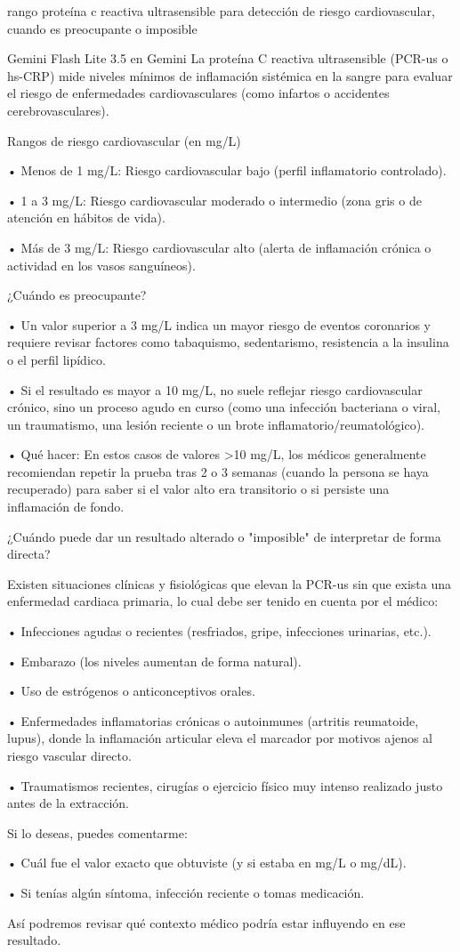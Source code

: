 \documentclass[12pt,a4paper,oneside]{book}
\begin{document}
\begin{iaprompt}
rango proteína c reactiva ultrasensible para detección de riesgo cardiovascular, cuando es preocupante o imposible
\end{iaprompt}
\begin{iaresp}{Gemini Flash Lite 3.5 en Gemini}
La proteína C reactiva ultrasensible (PCR-us o hs-CRP) mide niveles mínimos de inflamación sistémica en la sangre para evaluar el riesgo de enfermedades cardiovasculares (como infartos o accidentes cerebrovasculares).

Rangos de riesgo cardiovascular (en mg/L)

• Menos de 1 mg/L: Riesgo cardiovascular bajo (perfil inflamatorio controlado).

• 1 a 3 mg/L: Riesgo cardiovascular moderado o intermedio (zona gris o de atención en hábitos de vida).

• Más de 3 mg/L: Riesgo cardiovascular alto (alerta de inflamación crónica o actividad en los vasos sanguíneos).

¿Cuándo es preocupante?

• Un valor superior a 3 mg/L indica un mayor riesgo de eventos coronarios y requiere revisar factores como tabaquismo, sedentarismo, resistencia a la insulina o el perfil lipídico.

• Si el resultado es mayor a 10 mg/L, no suele reflejar riesgo cardiovascular crónico, sino un proceso agudo en curso (como una infección bacteriana o viral, un traumatismo, una lesión reciente o un brote inflamatorio/reumatológico).

• Qué hacer: En estos casos de valores >10 mg/L, los médicos generalmente recomiendan repetir la prueba tras 2 o 3 semanas (cuando la persona se haya recuperado) para saber si el valor alto era transitorio o si persiste una inflamación de fondo.

¿Cuándo puede dar un resultado alterado o "imposible" de interpretar de forma directa?

Existen situaciones clínicas y fisiológicas que elevan la PCR-us sin que exista una enfermedad cardiaca primaria, lo cual debe ser tenido en cuenta por el médico:

• Infecciones agudas o recientes (resfriados, gripe, infecciones urinarias, etc.).

• Embarazo (los niveles aumentan de forma natural).

• Uso de estrógenos o anticonceptivos orales.

• Enfermedades inflamatorias crónicas o autoinmunes (artritis reumatoide, lupus), donde la inflamación articular eleva el marcador por motivos ajenos al riesgo vascular directo.

• Traumatismos recientes, cirugías o ejercicio físico muy intenso realizado justo antes de la extracción.

Si lo deseas, puedes comentarme:

• Cuál fue el valor exacto que obtuviste (y si estaba en mg/L o mg/dL).

• Si tenías algún síntoma, infección reciente o tomas medicación.

Así podremos revisar qué contexto médico podría estar influyendo en ese resultado.
\end{iaresp}
\end{document}
